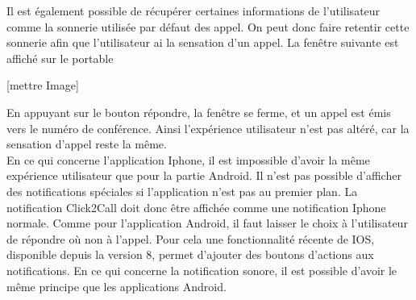 Il est également possible de récupérer certaines informations de l'utilisateur comme la sonnerie utilisée par défaut des appel. On peut donc faire retentir cette sonnerie afin que l'utilisateur ai la sensation d'un appel. La fenêtre suivante est affiché sur le portable

[mettre Image]

En appuyant sur le bouton répondre, la fenêtre se ferme, et un appel est émis vers le numéro de conférence. Ainsi l'expérience utilisateur n'est pas altéré, car la sensation d'appel reste la même.\\

En ce qui concerne l'application Iphone, il est impossible d'avoir la même expérience utilisateur que pour la partie Android. Il n'est pas possible d'afficher des notifications spéciales si l'application n'est pas au premier plan. La notification Click2Call  doit donc être affichée comme une notification Iphone normale. Comme pour l'application Android, il faut laisser le choix à l'utilisateur de répondre où non à l'appel. Pour cela une fonctionnalité récente de IOS, disponible depuis la version 8, permet d'ajouter des boutons d'actions aux notifications. En ce qui concerne la notification sonore, il est possible d'avoir le même principe que les applications Android.
